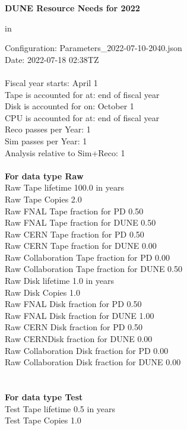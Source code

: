 \documentclass[12pt]{article}
\begin{document}
\centerline{\bf{DUNE Resource Needs for 2022}} in \par Configuration: Parameters\_2022-07-10-2040.json\\
  Date: 2022-07-18 02:38TZ\\
   \\
  
 Fiscal year starts: April 1\\ 
Tape is accounted for at: end of fiscal year\\ 
Disk is accounted for on: October 1\\ 
CPU is accounted for at: end of fiscal year\\ 
Reco passes per Year: 1\\
Sim passes per Year: 1\\
Analysis relative to Sim+Reco: 1\\
\pagebreak
\\
{\bf For data type Raw}\\
   Raw Tape lifetime 100.0 in years\\
   Raw Tape Copies   2.0\\
   Raw FNAL Tape fraction for PD  0.50\\
   Raw FNAL Tape fraction for DUNE  0.50\\
   Raw CERN Tape fraction for PD  0.50\\
   Raw CERN Tape fraction for DUNE  0.00\\
   Raw Collaboration Tape fraction for PD  0.00\\
   Raw Collaboration Tape fraction for DUNE  0.50\\
   Raw Disk lifetime   1.0 in years\\
   Raw Disk Copies   1.0\\
   Raw FNAL Disk fraction for PD  0.50\\
   Raw FNAL Disk fraction for DUNE  1.00\\
   Raw CERN Disk fraction for PD  0.50\\
   Raw CERNDisk fraction for DUNE  0.00\\
   Raw Collaboration Disk fraction for PD  0.00\\
   Raw Collaboration Disk fraction for DUNE  0.00\\
\pagebreak\\
\\
{\bf For data type Test}\\
  Test Tape lifetime   0.5 in years\\
  Test Tape Copies   1.0\\
\end{document}
